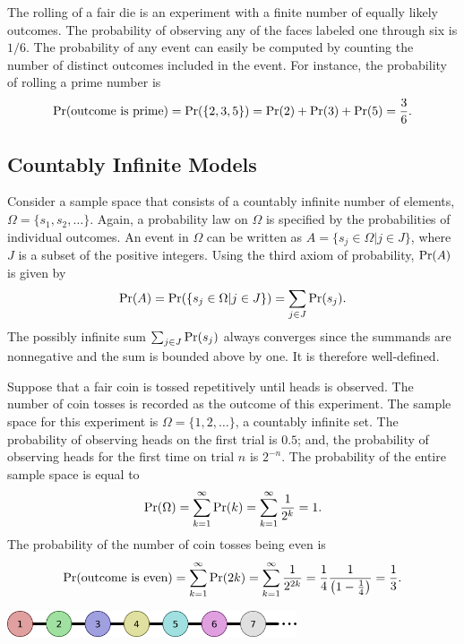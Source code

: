 \begin{example}
The rolling of a fair die is an experiment with a finite number of equally likely outcomes.
The probability of observing any of the faces labeled one through six is $1/6$.
The probability of any event can easily be computed by counting the number of distinct outcomes included in the event.
For instance, the probability of rolling a prime number is
\begin{equation*}
\Pr (\text{outcome is prime})
= \Pr ( \{ 2, 3, 5 \} )
= \Pr (2) + \Pr(3) + \Pr(5) = \frac{3}{6} .
\end{equation*}
\end{example}


\subsection{Countably Infinite Models}

Consider a sample space that consists of a countably infinite number of elements, $\Omega = \{ s_1, s_2, \ldots \}$.
Again, a probability law on $\Omega$ is specified by the probabilities of individual outcomes.
An event in $\Omega$ can be written as $A = \{ s_j \in \Omega | j \in J \}$, where $J$ is a subset of the positive integers.
Using the third axiom of probability, $\Pr (A)$ is given by
\begin{equation*}
\Pr (A)
= \Pr ( \{ s_j \in \Omega | j \in J \} )
= \sum_{j \in J} \Pr (s_j) .
\end{equation*}
The possibly infinite sum $\sum_{j \in J} \Pr (s_j)$ always converges since the summands are nonnegative and the sum is bounded above by one.
It is therefore well-defined.

\begin{example} \label{example:CoinTossSequence}
Suppose that a fair coin is tossed repetitively until heads is observed.
The number of coin tosses is recorded as the outcome of this experiment.
The sample space for this experiment is $\Omega = \{ 1, 2, \ldots \}$, a countably infinite set.
The probability of observing heads on the first trial is $0.5$; and, the probability of observing heads for the first time on trial $n$ is $2^{-n}$.
The probability of the entire sample space is equal to
\begin{equation*}
\Pr ( \Omega ) = \sum_{k=1}^{\infty} \Pr (k)
= \sum_{k=1}^{\infty} \frac{1}{2^k} = 1 .
\end{equation*}
The probability of the number of coin tosses being even is
\begin{equation*}
\Pr ( \text{outcome is even} )
= \sum_{k=1}^{\infty} \Pr (2k)
= \sum_{k = 1}^{\infty} \frac{1}{2^{2k}}
= \frac{1}{4} \frac{1}{ \left( 1 - \frac{1}{4} \right) }
= \frac{1}{3} .
\end{equation*}

\begin{center}
\includegraphics[height=0.765cm]{Figures/2Chapter/countablespace}
\end{center}
\end{example}

